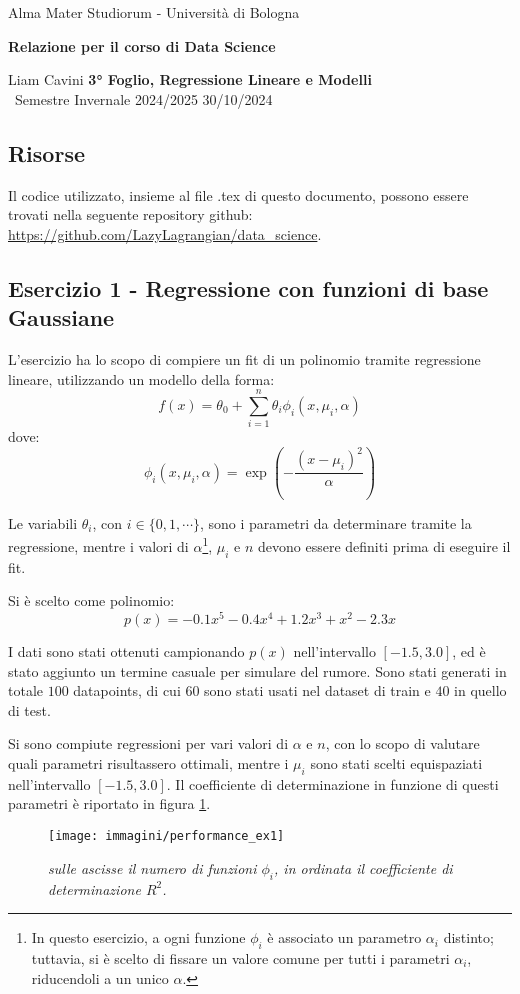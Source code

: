 \documentclass{article}
\begin{document}
\begin{center}
    {\Large Alma Mater Studiorum - Università di Bologna}
    
    \vspace{0.5cm}
    {\bf \large Relazione per il corso di Data Science}
\end{center} 

\noindent
{ Liam Cavini} \hfill {\bf 3° Foglio, Regressione Lineare e Modelli}\\
{\ Semestre Invernale 2024/2025} \hfill 30/10/2024

\subsection*{Risorse}
Il codice utilizzato, insieme al file .tex di questo documento, possono essere trovati nella seguente repository github: \url{https://github.com/LazyLagrangian/data_science}.

\subsection*{Esercizio 1 - Regressione con funzioni di base Gaussiane}
L'esercizio ha lo scopo di compiere un fit di un polinomio tramite regressione lineare, utilizzando un modello della forma:
\[
f(x) = \theta_0 + \sum_{i=1}^n \theta_i \phi_i(x, \mu_i,\alpha)
\]
dove:
\[
\phi_i(x, \mu_i,\alpha) = \exp(-\frac{(x-\mu_i)^2}{\alpha})
\]

Le variabili $\theta_i$, con $i \in \{0, 1, \cdots\}$, sono i parametri da determinare tramite la regressione, mentre i valori di $\alpha$\footnote[1]{In questo esercizio, a ogni funzione $\phi_i$ è associato un parametro $\alpha_i$ distinto; tuttavia, si è scelto di fissare un valore comune per tutti i parametri $\alpha_i$, riducendoli a un unico $\alpha$.}, $\mu_i$ e $n$ devono essere definiti prima di eseguire il fit.

Si è scelto come polinomio:
\[ 
p(x) = -0.1x^5-0.4x^4+1.2x^3+x^2-2.3x
\]

I dati sono stati ottenuti campionando $p(x)$ nell'intervallo $[-1.5, 3.0]$, ed è stato aggiunto un termine casuale per simulare del rumore.
Sono stati generati in totale $100$ datapoints, di cui $60$ sono stati usati nel dataset di train e $40$ in quello di test.

Si sono compiute regressioni per vari valori di $\alpha$ e $n$, con lo scopo di valutare quali parametri risultassero ottimali, mentre i $\mu_i$ sono stati scelti equispaziati nell'intervallo $[-1.5, 3.0]$.
Il coefficiente di determinazione in funzione di questi parametri è riportato in figura \ref{fig:parametri_ex1}.
\begin{figure}[H]
    \centering
    \texttt{[image: immagini/performance\_ex1]}
    \caption{\emph{sulle ascisse il numero di funzioni $\phi_i$, in ordinata il coefficiente di determinazione $R^2$.}}
    \label{fig:parametri_ex1}
\end{figure}
\end{document}
